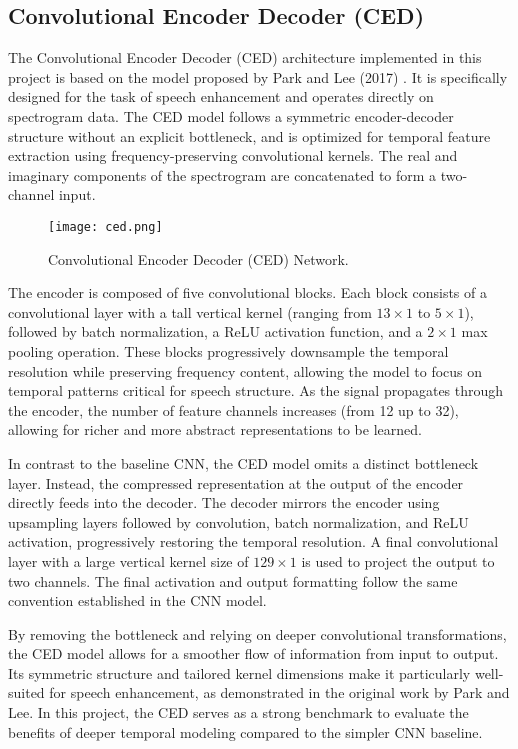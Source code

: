 \subsection{Convolutional Encoder Decoder (CED)}
\label{sec:ced}

The Convolutional Encoder Decoder (CED) architecture implemented in this project is based on the model proposed by Park and Lee (2017) \cite{park2017acoustic}. It is specifically designed for the task of speech enhancement and operates directly on spectrogram data. The CED model follows a symmetric encoder-decoder structure without an explicit bottleneck, and is optimized for temporal feature extraction using frequency-preserving convolutional kernels. The real and imaginary components of the spectrogram are concatenated to form a two-channel input.

\begin{figure}[h]
    \centering
    \texttt{[image: ced.png]}
    \caption{\label{fig:ced}Convolutional Encoder Decoder (CED) Network\cite{park2017acoustic}.}
\end{figure}

The encoder is composed of five convolutional blocks. Each block consists of a convolutional layer with a tall vertical kernel (ranging from \(13 \times 1\) to \(5 \times 1\)), followed by batch normalization, a ReLU activation function, and a \(2 \times 1\) max pooling operation. These blocks progressively downsample the temporal resolution while preserving frequency content, allowing the model to focus on temporal patterns critical for speech structure. As the signal propagates through the encoder, the number of feature channels increases (from 12 up to 32), allowing for richer and more abstract representations to be learned.

In contrast to the baseline CNN, the CED model omits a distinct bottleneck layer. Instead, the compressed representation at the output of the encoder directly feeds into the decoder. The decoder mirrors the encoder using upsampling layers followed by convolution, batch normalization, and ReLU activation, progressively restoring the temporal resolution. A final convolutional layer with a large vertical kernel size of \(129 \times 1\) is used to project the output to two channels. The final activation and output formatting follow the same convention established in the CNN model.

By removing the bottleneck and relying on deeper convolutional transformations, the CED model allows for a smoother flow of information from input to output. Its symmetric structure and tailored kernel dimensions make it particularly well-suited for speech enhancement, as demonstrated in the original work by Park and Lee. In this project, the CED serves as a strong benchmark to evaluate the benefits of deeper temporal modeling compared to the simpler CNN baseline.

